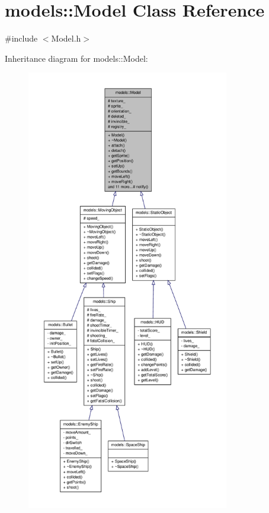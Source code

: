 \hypertarget{classmodels_1_1Model}{\section{models\-:\-:\-Model \-Class \-Reference}
\label{dd/db5/classmodels_1_1Model}
}


{\ttfamily \#include $<$\-Model.\-h$>$}



\-Inheritance diagram for models\-:\-:\-Model\-:
\nopagebreak
\begin{figure}[H]
\begin{center}
\leavevmode
\includegraphics[height=550pt]{dd/dc4/classmodels_1_1Model__inherit__graph}
\end{center}
\end{figure}
